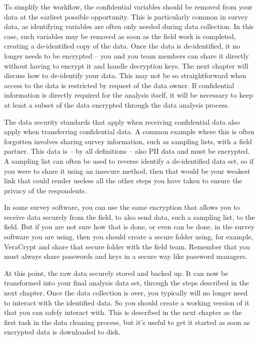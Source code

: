 To simplify the workflow,
the confidential variables should be removed from your data at the earliest possible opportunity.
This is particularly common in survey data,
as identifying variables are often only needed during data collection.
In this case, such variables may be removed as soon as the field work is completed,
creating a de-identified copy of the data.
Once the data is de-identified,
it no longer needs to be encrypted --
you and you team members can share it directly
without having to encrypt it and handle decryption keys.
The next chapter will discuss how to de-identify your data.
This may not be so straightforward when access to the data
is restricted by request of the data owner.
If confidential information is directly required for the analysis itself,
it will be necessary to keep at least a subset of the data encrypted through the data analysis process.

The data security standards that apply when receiving confidential data also apply when transferring confidential data.
A common example where this is often forgotten involves sharing survey information,
such as sampling lists, with a field partner.
This data is -- by all definitions -- also PII data and must be encrypted.
A sampling list can often be used to reverse identify a de-identified data set,
so if you were to share it using an insecure method,
then that would be your weakest link that could render useless all the other steps
you have taken to ensure the privacy of the respondents.

In some survey software, you can use the same encryption that allows you to receive data securely
from the field, to also send data, such a sampling list, to the field.
But if you are not sure how that is done, or even can be done,
in the survey software you are using,
then you should create a secure folder using, for example,
VeraCrypt and share that secure folder with the field team.
Remember that you must always share passwords and keys in a secure way like password managers.

At this point, the raw data securely stored and backed up.
It can now be transformed into your final analysis data set,
through the steps described in the next chapter.
Once the data collection is over,
you typically will no longer need to interact with the identified data.
So you should create a working version of it that you can safely interact with.
This is described in the next chapter as the first task in the data cleaning process,
but it's useful to get it started as soon as encrypted data is downloaded to disk.
